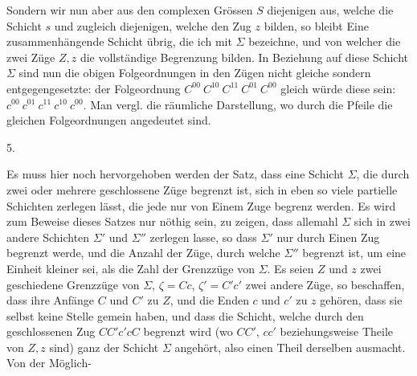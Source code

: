 Sondern wir nun aber aus den complexen Grössen \(S\) diejenigen aus, welche die Schicht \(s\) und zugleich diejenigen, welche den Zug \(z\) bilden, so bleibt Eine zusammenhängende Schicht übrig, die ich mit \(\Sigma\) bezeichne, und von welcher die zwei Züge \(Z,z\) die vollständige Begrenzung bilden. In Beziehung auf diese Schicht \(\Sigma\) sind nun die obigen Folgeordnungen in den Zügen nicht gleiche sondern entgegengesetzte: der Folgeordnung \(C^{00}\ C^{10}\ C^{11}\ C^{01}\ C^{00}\) gleich würde diese sein: \(c^{00}\ c^{01}\ c^{11}\ c^{10}\ c^{00}\). Man vergl. die räumliche Darstellung, wo durch die Pfeile die gleichen Folgeordnungen angedeutet sind.
\begin{center}
\end{center}
\begin{center}5.\end{center}
\noindent\hspace*{\parindent}Es muss hier noch hervorgehoben werden der Satz, dass eine Schicht \(\Sigma\), die durch zwei oder mehrere geschlossene Züge begrenzt ist, sich in eben so viele partielle Schichten zerlegen lässt, die jede nur von Einem Zuge begrenz werden. Es wird zum Beweise dieses Satzes nur nöthig sein, zu zeigen, dass allemahl \(\Sigma\) sich in zwei andere Schichten \(\Sigma'\) und \(\Sigma''\) zerlegen lasse, so dass \(\Sigma'\) nur durch Einen Zug begrenzt werde, und die Anzahl der Züge, durch welche \(\Sigma''\) begrenzt ist, um eine Einheit kleiner sei, als die Zahl der Grenzzüge von \(\Sigma\). Es seien \(Z\) und \(z\) zwei geschiedene Grenzzüge von \(\Sigma\), \(\zeta=Cc\), \(\zeta'=C'c'\) zwei andere Züge, so beschaffen, dass ihre Anfänge \(C\) und \(C'\) zu \(Z\), und die Enden \(c\) und \(c'\) zu \(z\) gehören, dass sie selbst keine Stelle gemein haben, und dass die Schicht, welche durch den geschlossenen Zug \(CC'c'cC\) begrenzt wird (wo \(CC',\,cc'\) beziehungsweise Theile von \(Z,z\) sind) ganz der Schicht \(\Sigma\) angehört, also einen Theil derselben ausmacht. Von der Möglich-
